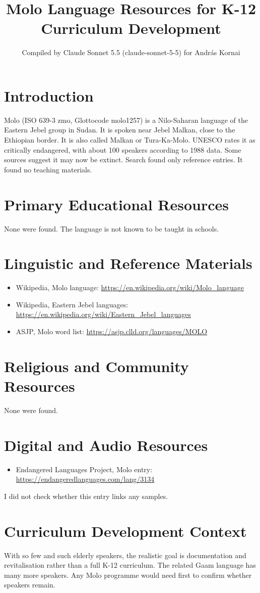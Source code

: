 \documentclass[12pt]{article}
\title{Molo Language Resources for K-12 Curriculum Development}
\author{Compiled by Claude Sonnet 5.5 (claude-sonnet-5-5) for Andr\'as Kornai}
\date{}
\begin{document}
\maketitle

\section{Introduction}
Molo (ISO 639-3 zmo, Glottocode molo1257) is a Nilo-Saharan language of the Eastern Jebel group in Sudan. It is spoken near Jebel Malkan, close to the Ethiopian border. It is also called Malkan or Tura-Ka-Molo. UNESCO rates it as critically endangered, with about 100 speakers according to 1988 data. Some sources suggest it may now be extinct. Search found only reference entries. It found no teaching materials.

\section{Primary Educational Resources}
None were found. The language is not known to be taught in schools.

\section{Linguistic and Reference Materials}
\begin{itemize}
\item Wikipedia, Molo language: \url{https://en.wikipedia.org/wiki/Molo_language}
\item Wikipedia, Eastern Jebel languages: \url{https://en.wikipedia.org/wiki/Eastern_Jebel_languages}
\item ASJP, Molo word list: \url{https://asjp.clld.org/languages/MOLO}
\end{itemize}

\section{Religious and Community Resources}
None were found.

\section{Digital and Audio Resources}
\begin{itemize}
\item Endangered Languages Project, Molo entry: \url{https://endangeredlanguages.com/lang/3134}
\end{itemize}
I did not check whether this entry links any samples.

\section{Curriculum Development Context}
With so few and such elderly speakers, the realistic goal is documentation and revitalisation rather than a full K-12 curriculum. The related Gaam language has many more speakers. Any Molo programme would need first to confirm whether speakers remain.
\end{document}
